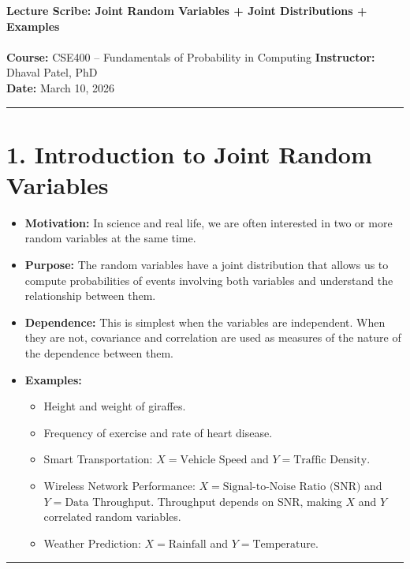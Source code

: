 \documentclass{article}
\begin{document}
\noindent \textbf{Lecture Scribe: Joint Random Variables + Joint Distributions + Examples} \\
\vspace{0.1cm} \\
\textbf{Course:} CSE400 -- Fundamentals of Probability in Computing \textbf{Instructor:} Dhaval Patel, PhD \\
\textbf{Date:} March 10, 2026

\vspace{0.5cm}
\hrule
\vspace{0.5cm}

\section*{1. Introduction to Joint Random Variables}

\begin{itemize}[label=\textbullet]
    \item \textbf{Motivation:} In science and real life, we are often interested in two or more random variables at the same time.
    \item \textbf{Purpose:} The random variables have a joint distribution that allows us to compute probabilities of events involving both variables and understand the relationship between them.
    \item \textbf{Dependence:} This is simplest when the variables are independent. When they are not, covariance and correlation are used as measures of the nature of the dependence between them.
    \item \textbf{Examples:}
    \begin{itemize}[label=$\circ$]
        \item Height and weight of giraffes.
        \item Frequency of exercise and rate of heart disease.
        \item Smart Transportation: $X = \text{Vehicle Speed}$ and $Y = \text{Traffic Density}$.
        \item Wireless Network Performance: $X = \text{Signal-to-Noise Ratio (SNR)}$ and $Y = \text{Data Throughput}$. Throughput depends on SNR, making $X$ and $Y$ correlated random variables.
        \item Weather Prediction: $X = \text{Rainfall}$ and $Y = \text{Temperature}$.
    \end{itemize}
\end{itemize}

\vspace{0.25cm}
\hrule
\vspace{0.25cm}
\end{document}
